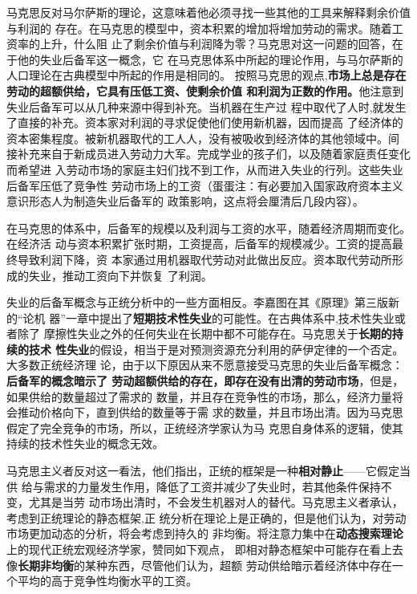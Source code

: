 马克思反对马尔萨斯的理论，这意味着他必须寻找一些其他的工具来解释剩余价值与利润的
存在。在马克思的模型中，资本积累的增加将增加劳动的需求。随着工资率的上升，什么阻
止了剩余价值与利润降为零？马克思对这一问题的回答，在于他的失业后备军这一概念，它
在马克思体系中所起的理论作用，与马尔萨斯的人口理论在古典模型中所起的作用是相同的。
按照马克思的观点,\textbf{市场上总是存在劳动的超额供给，它具有压低工资、使剩余价值
  和利润为正数的作用。}他注意到失业后备军可以从几种来源中得到补充。当机器在生产过
程中取代了人时,就发生了直接的补充。资本家对利润的寻求促使他们使用新机器，因而提高
了经济体的资本密集程度。被新机器取代的工人人，没有被吸收到经济体的其他领域中。间
接补充来自于新成员进入劳动力大军。完成学业的孩子们，以及随着家庭责任变化而希望进
入劳动市场的家庭主妇们找不到工作，从而进入失业的行列。这些失业后备军压低了竞争性
劳动市场上的工资（蛋蛋注：有必要加入国家政府资本主义意识形态人为制造失业后备军的
政策影响，这点将会厘清后几段内容）。

在马克思的体系中，后备军的规模以及利润与工资的水平，随着经济周期而变化。在经济活
动与资本积累扩张时期，工资提高，后备军的规模减少。工资的提高最终导致利润下降，资
本家通过用机器取代劳动对此做出反应。资本取代劳动所形成的失业，推动工资向下并恢复
了利润。

失业的后备军概念与正统分析中的一些方面相反。李嘉图在其《原理》第三版新的“论机
器”一章中提出了\textbf{短期技术性失业}的可能性。在古典体系中,技术性失业或者除了
摩擦性失业之外的任何失业在长期中都不可能存在。马克思关于\textbf{长期的持续的技术
  性失业}的假设，相当于是对预测资源充分利用的萨伊定律的一个否定。大多数正统经济理
论，由于以下原因从来不愿意接受马克思的失业后备军概念：\textbf{后备军的概念暗示了
  劳动超额供给的存在，即存在没有出清的劳动市场}，但是，如果供给的数量超过了需求的
数量，并且存在竞争性的市场，那么，经济力量将会推动价格向下，直到供给的数量等于需
求的数量，并且市场出清。因为马克思假定了完全竞争的市场，所以，正统经济学家认为马
克思自身体系的逻辑，使其持续的技术性失业的概念无效。

马克思主义者反对这一看法，他们指出，正统的框架是一种\textbf{相对静止}——它假定当供
给与需求的力量发生作用，降低了工资并减少了失业时，若其他条件保持不变，尤其是当劳
动市场出清时，不会发生机器对人的替代。马克思主义者承认，考虑到正统理论的静态框架,正
统分析在理论上是正确的，但是他们认为，对劳动市场更加动态的分析，将会考虑到持久的
非均衡。将注意力集中在\textbf{动态搜索理论}上的现代正统宏观经济学家，赞同如下观点，
即相对静态框架中可能存在看上去像\textbf{长期非均衡}的某种东西，尽管他们认为，超额
劳动供给暗示着经济体中存在一个平均的高于竞争性均衡水平的工资。

